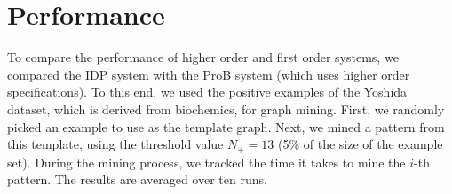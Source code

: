 \vspace{-2em}
\section{Performance}\label{sec:performance}
\vspace{-1em}
To compare the performance of higher order and first order systems, we compared the IDP system with the ProB system (which uses higher order specifications).
To this end, we used the positive examples of the Yoshida~\citep{yoshida_dataset} dataset, which is derived from biochemics, for graph mining.
First, we randomly picked an example to use as the template graph.
Next, we mined a pattern from this template, using the threshold value $N_{+} = 13$ (5\% of the size of the example set).
During the mining process, we tracked the time it takes to mine the $i$-th pattern. The results are averaged over ten runs.


